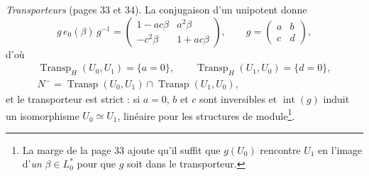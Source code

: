 \documentclass[11pt,a4paper]{article}
\begin{document}
\emph{Transporteurs} (pages 33 et 34). La conjugaison d'un unipotent donne
\[
  g\,e_0(\beta)\,g^{-1} = \begin{pmatrix} 1 - ac\beta & a^2\beta \\ -c^2\beta & 1
  + ac\beta\end{pmatrix},\qquad g = \begin{pmatrix} a & b \\ c & d\end{pmatrix},
\]
d'où
\[
  \begin{gathered}
  \operatorname{Transp}_H(U_0, U_1) = \{a = 0\},\qquad
  \operatorname{Transp}_H(U_1, U_0) = \{d = 0\},\\
  N^{-} = \operatorname{Transp}(U_0, U_1) \cap \operatorname{Transp}(U_1, U_0),
  \end{gathered}
\]
et le transporteur est strict : si $a = 0$, $b$ et $c$ sont inversibles et
$\operatorname{int}(g)$ induit un isomorphisme $U_0 \simeq U_1$, linéaire
pour les structures de module\footnote{La marge de la page 33 ajoute qu'il
suffit que $g(U_0)$ rencontre $U_1$ en l'image d'\emph{un} $\beta \in L_0^{*}$
pour que $g$ soit dans le transporteur.}.
\end{document}
